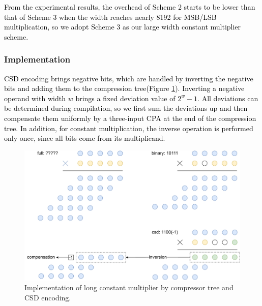 \documentclass[conference]{IEEEtran}
\begin{document}
\textcolor{black}{
From the experimental results, the overhead of Scheme 2 starts to be lower than that of Scheme 3 when the width reaches nearly 8192 for MSB/LSB multiplication, so we adopt Scheme 3 as our large width constant multiplier scheme.
}

\subsubsection{Implementation}



\textcolor{black}{
CSD encoding brings negative bits, which are handled by inverting the negative bits and adding them to the compression tree(Figure \ref{Figure10}). Inverting a negative operand with width $w$ brings a fixed deviation value of $2^w - 1$. All deviations can be determined during compilation, so we first sum the deviations up and then compensate them uniformly by a three-input CPA at the end of the compression tree. In addition, for constant multiplication, the inverse operation is performed only once, since all bits come from its multiplicand.
}


\begin{figure}[htbp]   %
	\centering
	\includegraphics[width=\linewidth,scale=1.00]{fig10.pdf}    %
	\caption{Implementation of long constant multiplier by compressor tree and CSD encoding.}
	\label{Figure10}
\end{figure}
\end{document}
